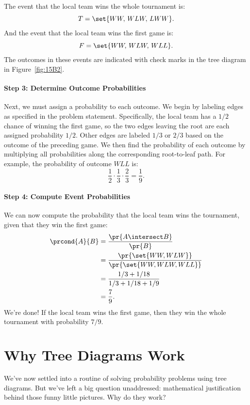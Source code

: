 The event that the local team wins the whole tournament is:
%
\[
    T = \set{WW,\, WLW,\, LWW}.
\]
%
And the event that the local team wins the first game is:
%
\[
    F = \set{WW,\, WLW,\, WLL }.
\]
%
The outcomes in these events are indicated with check marks in the tree
diagram in Figure~\ref{fig:15B2}.

\paragraph{Step 3:  Determine Outcome Probabilities}

Next, we must assign a probability to each outcome.  We begin by
labeling edges as specified in the problem statement.  Specifically,
the local team has a $1/2$ chance of winning the first game, so
the two edges leaving the root are each assigned probability $1/2$.
Other edges are labeled $1/3$ or $2/3$ based on the outcome of the
preceding game.  We then find the probability of each outcome by
multiplying all probabilities along the corresponding root-to-leaf
path.  For example, the probability of outcome $WLL$ is:
%
\[
    \frac{1}{2} \cdot \frac{1}{3} \cdot \frac{2}{3} = \frac{1}{9}.
\]

\paragraph{Step 4: Compute Event Probabilities}

We can now compute the probability that the local team wins the
tournament, given that they win the first game:
%
\begingroup
{}
\begin{align*}
\prcond{A}{B}
    & = \frac{\pr{A \intersect B}}{\pr{B}} \\
    & = \frac{\pr{\set{WW, WLW}}}{\pr{\set{WW, WLW, WLL}}} \\
    & = \frac{1/3 + 1/18}{1/3 + 1/18 + 1/9} \\
    & = \frac{7}{9}.
\end{align*}
\endgroup
%
We're done!  If the local team wins the first game, then they win
the whole tournament with probability $7 / 9$.

\section{Why Tree Diagrams Work}\label{product_rule_subsec}

We've now settled into a routine of solving probability problems using
tree diagrams.  But we've left a big question unaddressed:
mathematical justification behind those funny little pictures.  Why do
they work?


